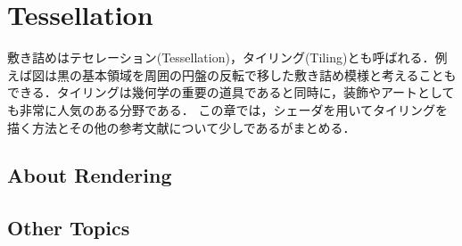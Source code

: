 
\section{Tessellation}

敷き詰めはテセレーション(Tessellation)，タイリング(Tiling)とも呼ばれる．例えば図は黒の基本領域を周囲の円盤の反転で移した敷き詰め模様と考えることもできる．タイリングは幾何学の重要の道具であると同時に，装飾やアートとしても非常に人気のある分野である．
この章では，シェーダを用いてタイリングを描く方法とその他の参考文献について少しであるがまとめる．

\subsection{About Rendering}


\subsection{Other Topics}
